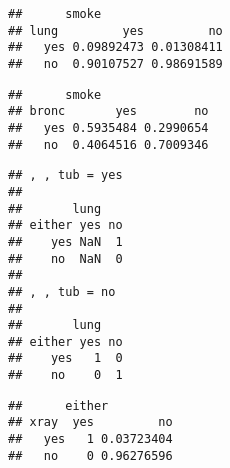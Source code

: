 \documentclass[
]{article}
\newenvironment{Shaded}{\begin{snugshade}}{\end{snugshade}}
\newcommand{\CommentTok}[1]{\textcolor[rgb]{0.56,0.35,0.01}{\textit{#1}}}
\newcommand{\NormalTok}[1]{#1}
\newcommand{\OperatorTok}[1]{\textcolor[rgb]{0.81,0.36,0.00}{\textbf{#1}}}
\begin{document}
\begin{Shaded}
\end{Shaded}

\begin{verbatim}
##      smoke
## lung         yes         no
##   yes 0.09892473 0.01308411
##   no  0.90107527 0.98691589
\end{verbatim}

\begin{Shaded}
\end{Shaded}

\begin{verbatim}
##      smoke
## bronc       yes        no
##   yes 0.5935484 0.2990654
##   no  0.4064516 0.7009346
\end{verbatim}

\begin{Shaded}
\end{Shaded}

\begin{verbatim}
## , , tub = yes
## 
##       lung
## either yes no
##    yes NaN  1
##    no  NaN  0
## 
## , , tub = no
## 
##       lung
## either yes no
##    yes   1  0
##    no    0  1
\end{verbatim}

\begin{Shaded}
\end{Shaded}

\begin{verbatim}
##      either
## xray  yes         no
##   yes   1 0.03723404
##   no    0 0.96276596
\end{verbatim}

\begin{Shaded}
\end{Shaded}
\end{document}
